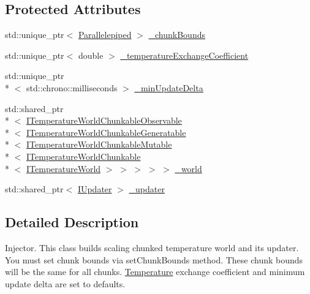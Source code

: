 \subsection*{Protected Attributes}
\begin{DoxyCompactItemize}
\item 
std\-::unique\-\_\-ptr$<$ \hyperlink{struct_parallelepiped}{Parallelepiped} $>$ \hyperlink{class_scaling_generatable_chunked_temperature_world_injector_a511f1fe9ca03a0a986a2c5fef635ffac}{\-\_\-chunk\-Bounds}
\item 
std\-::unique\-\_\-ptr$<$ double $>$ \hyperlink{class_scaling_generatable_chunked_temperature_world_injector_a53d05cc0f6fc96e9c8e78fcfc2255f63}{\-\_\-temperature\-Exchange\-Coefficient}
\item 
std\-::unique\-\_\-ptr\\*
$<$ std\-::chrono\-::milliseconds $>$ \hyperlink{class_scaling_generatable_chunked_temperature_world_injector_aed21ecf6e5237f4a0fd9cea9112c2f03}{\-\_\-min\-Update\-Delta}
\item 
std\-::shared\-\_\-ptr\\*
$<$ \hyperlink{class_i_temperature_world_chunkable_observable}{I\-Temperature\-World\-Chunkable\-Observable}\\*
$<$ \hyperlink{class_i_temperature_world_chunkable_generatable}{I\-Temperature\-World\-Chunkable\-Generatable}\\*
$<$ \hyperlink{class_i_temperature_world_chunkable_mutable}{I\-Temperature\-World\-Chunkable\-Mutable}\\*
$<$ \hyperlink{class_i_temperature_world_chunkable}{I\-Temperature\-World\-Chunkable}\\*
$<$ \hyperlink{class_i_temperature_world}{I\-Temperature\-World} $>$ $>$ $>$ $>$ $>$ \hyperlink{class_scaling_generatable_chunked_temperature_world_injector_a8af169452d94765c5bdd6302f5420ebb}{\-\_\-world}
\item 
std\-::shared\-\_\-ptr$<$ \hyperlink{class_i_updater}{I\-Updater} $>$ \hyperlink{class_scaling_generatable_chunked_temperature_world_injector_aa94745f5caba594ed9dcfbfc21685358}{\-\_\-updater}
\end{DoxyCompactItemize}


\subsection{Detailed Description}
Injector. This class builds scaling chunked temperature world and its updater. You must set chunk bounds via {\ttfamily set\-Chunk\-Bounds} method. These chunk bounds will be the same for all chunks. \hyperlink{struct_temperature}{Temperature} exchange coefficient and minimum update delta are set to defaults. 

